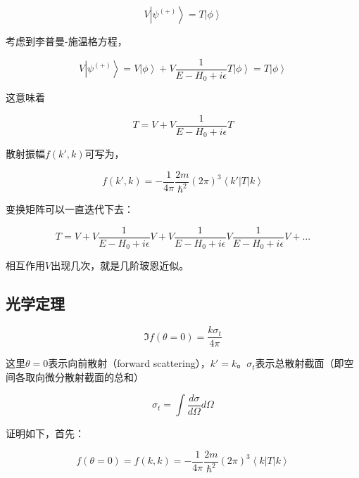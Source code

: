 \begin{equation}
V \left| \psi^{(+)} \right\rangle = T \left| \phi \right\rangle 
\end{equation}

考虑到李普曼-施温格方程，

\begin{equation}
V \left| \psi^{(+)} \right\rangle = V \left| \phi \right\rangle + V \frac{1}{E- H_0 + i \epsilon} T \left| \phi \right\rangle = T \left| \phi \right\rangle
\end{equation}

这意味着

\begin{equation}
T = V + V \frac{1}{E - H_0 + i \epsilon} T
\end{equation}

散射振幅$f(k',k)$可写为，

\begin{equation}
f(k',k) = - \frac{1}{4 \pi} \frac{2m}{\hbar^2} (2\pi)^3 \left\langle k' \right| T \left| k \right\rangle
\end{equation}

变换矩阵可以一直迭代下去：

\begin{equation}
T = V + V \frac{1}{E - H_0 + i \epsilon} V + V \frac{1}{E - H_0 + i \epsilon} V \frac{1}{E - H_0 + i \epsilon} V + ...
\end{equation}

相互作用$V$出现几次，就是几阶玻恩近似。

\subsection{光学定理}

\begin{equation}
\Im f(\theta = 0) = \frac{k \sigma_t}{4 \pi}
\end{equation}

这里$\theta =0$表示向前散射（forward scattering），$k' = k$。$\sigma_t$表示总散射截面（即空间各取向微分散射截面的总和）

\begin{equation}
\sigma_t = \int \frac{d \sigma }{d \Omega} d \Omega
\end{equation}

证明如下，首先：

\begin{equation}
f(\theta = 0) = f(k,k) = - \frac{1}{4 \pi}\frac{2m}{\hbar^2} (2 \pi)^3 \left\langle k \right| T \left| k \right\rangle
\end{equation}

